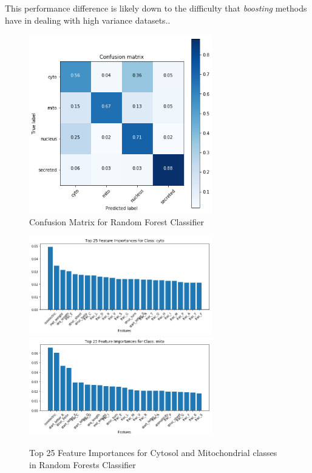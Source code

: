 \documentclass{bioinfo}
\begin{document}
This performance difference is likely down to the difficulty that \textit{boosting} methods have in dealing with high variance datasets.. 
\begin{figure}[!h]
\includegraphics[width=8cm]{confusion}
\caption{Confusion Matrix for Random Forest Classifier}
\label{fig:confusion}
\centering
\end{figure}

\begin{figure}[t]
\includegraphics[width=8cm]{cyto_import}
\centering
\includegraphics[width=8cm]{mito_import}
\centering
\caption{Top 25 Feature Importances for Cytosol and Mitochondrial classes in Random Forests Classifier}
\label{fig:import1}
\end{figure}
\end{document}
